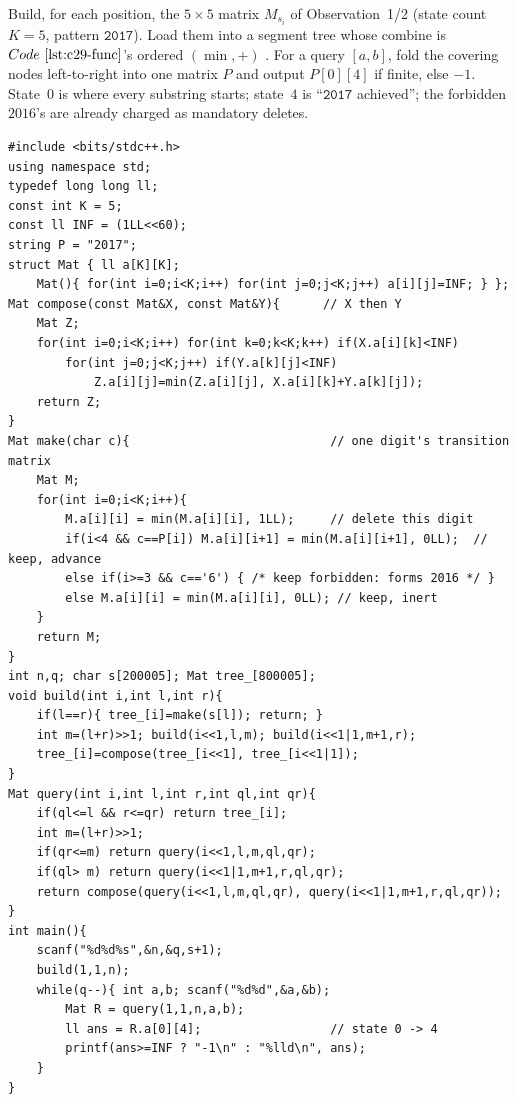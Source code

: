 Build, for each position, the \(5\times5\) matrix \(M_{s_i}\) of
Observation~1/2 (state count \(K=5\), pattern \(\texttt{2017}\)).  Load them into
a segment tree whose combine is \(\coderef{c29-func}\)'s ordered \((\min,+)\)
.  For a query \([a,b]\), fold the covering nodes left-to-right into
one matrix \(P\) and output \(P[0][4]\) if finite, else \(-1\).  State~\(0\) is
where every substring starts; state~\(4\) is ``\(\texttt{2017}\) achieved''; the
forbidden \(2016\)'s are already charged as mandatory deletes.

\begin{lstlisting}[caption={CF 750E: per-digit min-plus automaton matrices chained by a segment tree. make(c) encodes advance/inert/must-delete-6; query folds the range's matrices in order; answer is entry [0][4]}, label={lst:c29-750e}]
#include <bits/stdc++.h>
using namespace std;
typedef long long ll;
const int K = 5;
const ll INF = (1LL<<60);
string P = "2017";
struct Mat { ll a[K][K];
    Mat(){ for(int i=0;i<K;i++) for(int j=0;j<K;j++) a[i][j]=INF; } };
Mat compose(const Mat&X, const Mat&Y){      // X then Y
    Mat Z;
    for(int i=0;i<K;i++) for(int k=0;k<K;k++) if(X.a[i][k]<INF)
        for(int j=0;j<K;j++) if(Y.a[k][j]<INF)
            Z.a[i][j]=min(Z.a[i][j], X.a[i][k]+Y.a[k][j]);
    return Z;
}
Mat make(char c){                            // one digit's transition matrix
    Mat M;
    for(int i=0;i<K;i++){
        M.a[i][i] = min(M.a[i][i], 1LL);     // delete this digit
        if(i<4 && c==P[i]) M.a[i][i+1] = min(M.a[i][i+1], 0LL);  // keep, advance
        else if(i>=3 && c=='6') { /* keep forbidden: forms 2016 */ }
        else M.a[i][i] = min(M.a[i][i], 0LL); // keep, inert
    }
    return M;
}
int n,q; char s[200005]; Mat tree_[800005];
void build(int i,int l,int r){
    if(l==r){ tree_[i]=make(s[l]); return; }
    int m=(l+r)>>1; build(i<<1,l,m); build(i<<1|1,m+1,r);
    tree_[i]=compose(tree_[i<<1], tree_[i<<1|1]);
}
Mat query(int i,int l,int r,int ql,int qr){
    if(ql<=l && r<=qr) return tree_[i];
    int m=(l+r)>>1;
    if(qr<=m) return query(i<<1,l,m,ql,qr);
    if(ql> m) return query(i<<1|1,m+1,r,ql,qr);
    return compose(query(i<<1,l,m,ql,qr), query(i<<1|1,m+1,r,ql,qr));
}
int main(){
    scanf("%d%d%s",&n,&q,s+1);
    build(1,1,n);
    while(q--){ int a,b; scanf("%d%d",&a,&b);
        Mat R = query(1,1,n,a,b);
        ll ans = R.a[0][4];                  // state 0 -> 4
        printf(ans>=INF ? "-1\n" : "%lld\n", ans);
    }
}
\end{lstlisting}

